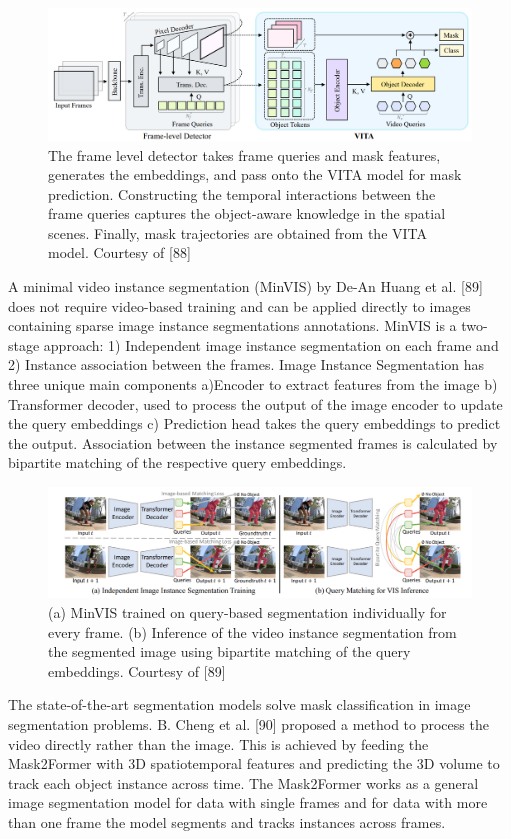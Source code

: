     \begin{figure}
    	\centering
    	\includegraphics[width=13cm]{images/VITA.png}
    	\caption{The frame level detector takes frame queries and mask features, generates the embeddings, and pass onto the VITA model for mask prediction. Constructing the temporal interactions between the frame queries captures the object-aware knowledge in the spatial scenes. Finally, mask trajectories are obtained from the VITA model. Courtesy of [88]}
    	\label{fig:vita}
    \end{figure}
    A minimal video instance segmentation (MinVIS) by De-An Huang et al. [89] does not require video-based training and can be applied directly to images containing sparse image instance segmentations annotations. MinVIS is a two-stage approach: 1) Independent image instance segmentation on each frame and 2) Instance association between the frames. Image Instance Segmentation has three unique main components a)Encoder to extract features from the image b) Transformer decoder, used to process the output of the image encoder to update the query embeddings c) Prediction head takes the query embeddings to predict the output. Association between the instance segmented frames is calculated by bipartite matching of the respective query embeddings.   
    
    \begin{figure}
    	\centering
    	\includegraphics[width=13cm]{images/minVIS.png}
    	\caption{(a) MinVIS trained on query-based segmentation individually for every frame. (b) Inference of the video instance segmentation from the segmented image using bipartite matching of the query embeddings. Courtesy of [89] }
    	\label{fig:minVIS}
    \end{figure}
    The state-of-the-art segmentation models solve mask classification in image segmentation problems. B. Cheng et al. [90] proposed a method to process the video directly rather than the image. This is achieved by feeding the Mask2Former with 3D spatiotemporal features and predicting the 3D volume to track each object instance across time. The Mask2Former works as a general image segmentation model for data with single frames and for data with more than one frame the model segments and tracks instances across frames. 
    
